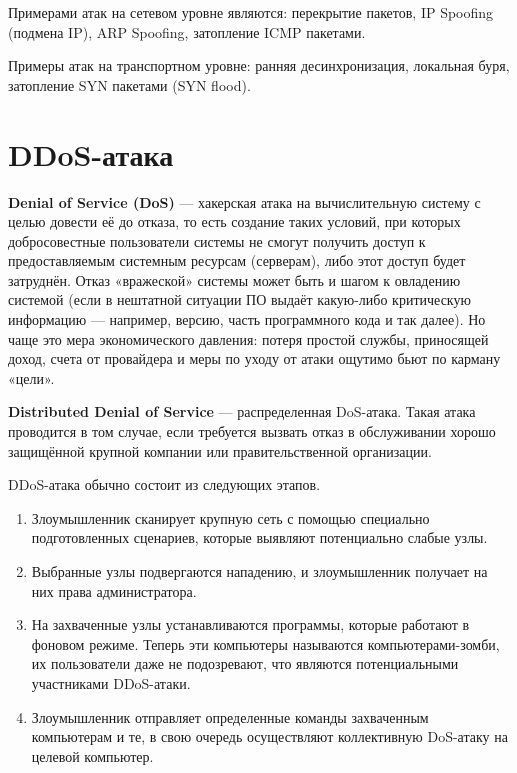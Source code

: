 \documentclass{bmstu}
\begin{document}
Примерами атак на сетевом уровне являются: перекрытие пакетов, IP Spoofing (подмена IP), ARP Spoofing, затопление ICMP пакетами.

Примеры атак на транспортном уровне: ранняя десинхронизация, локальная буря, затопление SYN пакетами (SYN flood).

\section*{DDoS-атака}

\textbf{Denial of Service (DoS)} --- хакерская атака на вычислительную систему с целью довести её до отказа, то есть создание таких условий, при которых добросовестные пользователи системы не смогут получить доступ к предоставляемым системным ресурсам (серверам), либо этот доступ будет затруднён. Отказ «вражеской» системы может быть и шагом к овладению системой (если в нештатной ситуации ПО выдаёт какую-либо критическую информацию --- например, версию, часть программного кода и так далее). Но чаще это мера экономического давления: потеря простой службы, приносящей доход, счета от провайдера и меры по уходу от атаки ощутимо бьют по карману «цели».


\textbf{Distributed Denial of Service} --- распределенная DoS-атака. Такая атака проводится в том случае, если требуется вызвать отказ в обслуживании хорошо защищённой крупной компании или правительственной организации. 

DDoS-атака обычно состоит из следующих этапов.

\begin{enumerate}
    \item Злоумышленник сканирует крупную сеть с помощью специально подготовленных сценариев, которые выявляют потенциально слабые узлы.
    \item Выбранные узлы подвергаются нападению, и злоумышленник получает на них права администратора.
    \item На захваченные узлы устанавливаются программы, которые работают в фоновом режиме. Теперь эти компьютеры называются компьютерами-зомби, их пользователи даже не подозревают, что являются потенциальными участниками DDoS-атаки.
    \item Злоумышленник отправляет определенные команды захваченным компьютерам и те, в свою очередь осуществляют коллективную DoS-атаку на целевой компьютер.
\end{enumerate}

\end{document}
